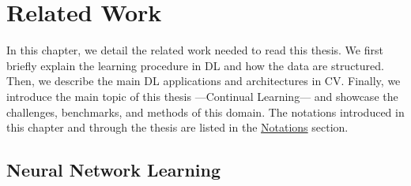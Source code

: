 \chapter{Related Work}
\label{chapter:related}


{}



In this chapter, we detail the related work needed to read this thesis. We first briefly
explain the learning procedure in \acf{DL} and how the data are structured. Then, we describe the main
\ac{DL} applications and architectures in \acf{CV}. Finally, we introduce the main topic of this thesis
---Continual Learning--- and showcase the challenges, benchmarks, and methods of this domain. The
notations introduced in this chapter and through the thesis are listed in the
\hyperref[chap:notations]{Notations} section.

\section{Neural Network Learning}

